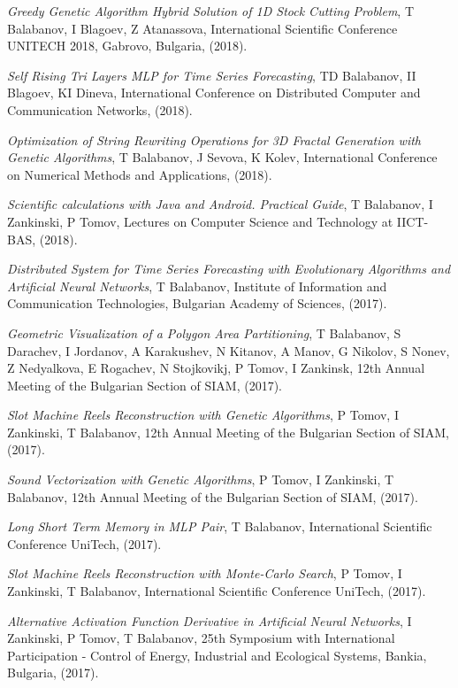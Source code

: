 \documentclass[english,a4paper]{europasscv}
\begin{document}
\begin{europasscv}
{\begin{ecvitemize}
    \item \textit{Greedy Genetic Algorithm Hybrid Solution of 1D Stock Cutting Problem}, T Balabanov, I Blagoev, Z Atanassova, International Scientific Conference UNITECH 2018, Gabrovo, Bulgaria, (2018).
    \item \textit{Self Rising Tri Layers MLP for Time Series Forecasting}, TD Balabanov, II Blagoev, KI Dineva, International Conference on Distributed Computer and Communication Networks, (2018).
    \item \textit{Optimization of String Rewriting Operations for 3D Fractal Generation with Genetic Algorithms}, T Balabanov, J Sevova, K Kolev, International Conference on Numerical Methods and Applications, (2018).
    \item \textit{Scientific calculations with Java and Android. Practical Guide}, T Balabanov, I Zankinski, P Tomov, Lectures on Computer Science and Technology at IICT-BAS, (2018).
    \item \textit{Distributed System for Time Series Forecasting with Evolutionary Algorithms and Artificial Neural Networks}, T Balabanov, Institute of Information and Communication Technologies, Bulgarian Academy of Sciences, (2017).
    \item \textit{Geometric Visualization of a Polygon Area Partitioning}, T Balabanov, S Darachev, I Jordanov, A Karakushev, N Kitanov, A Manov, G Nikolov, S Nonev, Z Nedyalkova, E Rogachev, N Stojkovikj, P Tomov, I Zankinsk, 12th Annual Meeting of the Bulgarian Section of SIAM, (2017).
    \item \textit{Slot Machine Reels Reconstruction with Genetic Algorithms}, P Tomov, I Zankinski, T Balabanov, 12th Annual Meeting of the Bulgarian Section of SIAM, (2017).
    \item \textit{Sound Vectorization with Genetic Algorithms}, P Tomov, I Zankinski, T Balabanov, 12th Annual Meeting of the Bulgarian Section of SIAM, (2017).
    \item \textit{Long Short Term Memory in MLP Pair}, T Balabanov, International Scientific Conference UniTech, (2017).
    \item \textit{Slot Machine Reels Reconstruction with Monte-Carlo Search}, P Tomov, I Zankinski, T Balabanov, International Scientific Conference UniTech, (2017).
    \item \textit{Alternative Activation Function Derivative in Artificial Neural Networks}, I Zankinski, P Tomov, T Balabanov, 25th Symposium with International Participation - Control of Energy, Industrial and Ecological Systems, Bankia, Bulgaria, (2017).

\end{ecvitemize}}
\end{europasscv}
\end{document}

